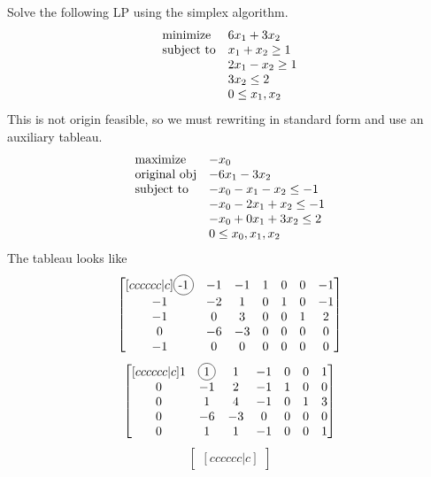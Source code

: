 \documentclass[12pt]{article}
\newcommand*\circled[1]{\tikz[baseline=(char.base)]{
		\node[shape=circle,draw,inner sep=2pt] (char) {#1};}}
\newenvironment{exercise}[2][Exercise]{\begin{trivlist}
		\item[\hskip \labelsep {\bfseries #1}\hskip \labelsep {\bfseries #2.}]}{\end{trivlist}}
\begin{document}
\begin{exercise}{3} Solve the following LP using the simplex algorithm.
\begin{equation*}
\begin{array}{ll@{}ll}
\text{minimize}  & \displaystyle 6x_1+3x_2 &\\
\text{subject to}& \displaystyle x_1 + x_2 \geq 1   \\
                 & \displaystyle 2x_1 - x_2 \geq 1 \\
                 & \displaystyle 3x_2 \leq 2 \\
                 & \displaystyle 0 \leq x_1,x_2
\end{array}
\end{equation*}
This is not origin feasible, so we must rewriting in standard form and use an auxiliary tableau.
\begin{equation*}
	\begin{array}{ll@{}ll}
		\text{maximize}  & \displaystyle -x_0 &\\
		\text{original obj}  & \displaystyle -6x_1-3x_2 &\\
		\text{subject to}& \displaystyle -x_0 -x_1 - x_2 \leq -1   \\
		& \displaystyle -x_0 -2x_1 + x_2 \leq -1 \\
		& \displaystyle -x_0 + 0x_1+ 3x_2 \leq 2 \\
		& \displaystyle 0 \leq x_0,x_1,x_2
	\end{array}
\end{equation*}
The tableau looks like
\[\begin{bmatrix}[cccccc|c]
	\circled{-1} & -1 & -1 & 1 & 0 & 0 & -1\\
	-1 & -2 &  1 & 0 & 1 & 0 & -1\\
	-1 &  0 &  3 & 0 & 0 & 1 &  2\\
	 0 & -6 & -3 & 0 & 0 & 0 &  0\\
	-1 &  0 &  0 & 0 & 0 & 0 &  0\\
\end{bmatrix}\]
\[\begin{bmatrix}[cccccc|c]
	1 &  \circled{1} &  1 & -1 & 0 & 0 & 1\\
	0 & -1 &  2 & -1 & 1 & 0 & 0\\
	0 &  1 &  4 & -1 & 0 & 1 & 3\\
	0 & -6 & -3 &  0 & 0 & 0 &  0\\
	0 &  1 &  1 & -1 & 0 & 0 &  1\\
\end{bmatrix}\]
\[\begin{bmatrix}[cccccc|c]

\end{bmatrix}\]
\end{exercise}
\end{document}
